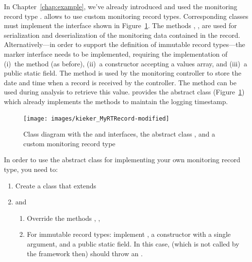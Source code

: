 In Chapter~\ref{chap:example}, we've already introduced and used the monitoring %
record type . \Kieker{} allows to use custom %
monitoring record types. Corresponding classes must implement the %
interface  shown in Figure~\ref{sec:monitoringrecord:interfacesAndImplementingClasses}. %
The methods , ,  %
are used for serialization and deserialization of the monitoring data contained %
in the record. Alternatively---in order to support the definition of immutable record types---the %
marker interface  needs to be implemented, requiring the %
implementation of (i)~the  method (as before), (ii)~a %
constructor accepting a values array, and (iii)~a public static  %
field. The method  is used by the monitoring controller to %
store the date and time when a record is received by the controller. %
The method  can be used during analysis to retrieve %
this value. \KiekerMonitoringPart{} provides the abstract class %
 (Figure~\ref{sec:monitoringrecord:interfacesAndImplementingClasses}) %
which already implements the methods to maintain the logging timestamp.

\begin{figure}[ht]\centering
\texttt{[image: images/kieker\_MyRTRecord-modified]}
\caption{Class diagram with the  and  interfaces, the abstract %
class , and a custom monitoring record type %
}
\label{sec:monitoringrecord:interfacesAndImplementingClasses}
\end{figure}


\noindent In order to use the abstract class for implementing your own monitoring record type, you need to:

\begin{enumerate}
\item Create a class that extends 
\item  and
\begin{enumerate}
\item Override the methods , , 
\item For immutable record types: implement , a constructor %
with a single  argument, and a public static  field. %
In this case,  (which is not called by the framework then) should %
throw an .
\end{enumerate}
\end{enumerate}

